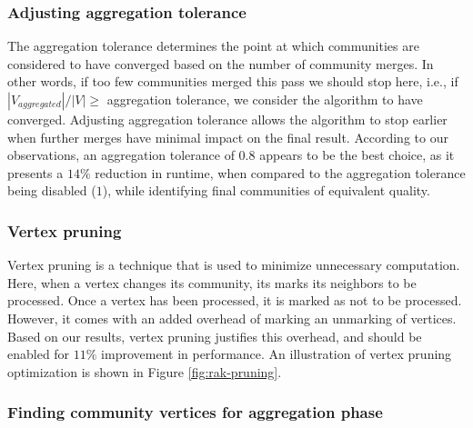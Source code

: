 \subsubsection{Adjusting aggregation tolerance}

The aggregation tolerance determines the point at which communities are considered to have converged based on the number of community merges. In other words, if too few communities merged this pass we should stop here, i.e., if $|V_{aggregated}|/|V| \geq$ aggregation tolerance, we consider the algorithm to have converged. Adjusting aggregation tolerance allows the algorithm to stop earlier when further merges have minimal impact on the final result. According to our observations, an aggregation tolerance of $0.8$ appears to be the best choice, as it presents a $14\%$ reduction in runtime, when compared to the aggregation tolerance being disabled ($1$), while identifying final communities of equivalent quality.


\subsubsection{Vertex pruning}

Vertex pruning is a technique that is used to minimize unnecessary computation. Here, when a vertex changes its community, its marks its neighbors to be processed. Once a vertex has been processed, it is marked as not to be processed. However, it comes with an added overhead of marking an unmarking of vertices. Based on our results, vertex pruning justifies this overhead, and should be enabled for $11\%$ improvement in performance. An illustration of vertex pruning optimization is shown in Figure \ref{fig:rak-pruning}.




\subsubsection{Finding community vertices for aggregation phase}

